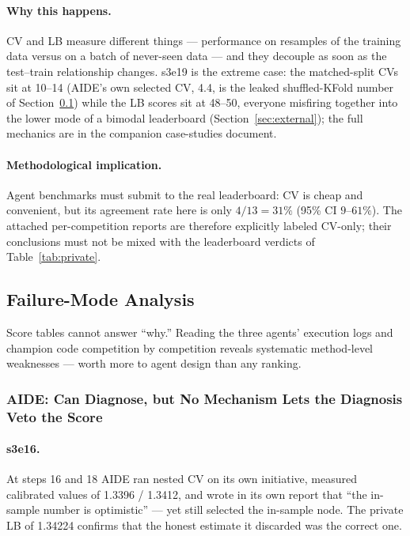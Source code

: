 \documentclass[11pt,a4paper]{article}
\begin{document}
\paragraph{Why this happens.} CV and LB measure different things --- performance on resamples of the training data versus on a batch of never-seen data --- and they decouple as soon as the test--train relationship changes. s3e19 is the extreme case: the matched-split CVs sit at 10--14 (AIDE's own selected CV, 4.4, is the leaked shuffled-KFold number of Section~\ref{sec:exp4}) while the LB scores sit at 48--50, everyone misfiring together into the lower mode of a bimodal leaderboard (Section~\ref{sec:external}); the full mechanics are in the companion case-studies document.

\paragraph{Methodological implication.} Agent benchmarks must submit to the real leaderboard: CV is cheap and convenient, but its agreement rate here is only $4/13 = 31\%$ (95\% CI $9$--$61\%$). The attached per-competition reports are therefore explicitly labeled CV-only; their conclusions must not be mixed with the leaderboard verdicts of Table~\ref{tab:private}.

\subsection{Failure-Mode Analysis}
\label{sec:exp4}

Score tables cannot answer ``why.'' Reading the three agents' execution logs and champion code competition by competition reveals systematic method-level weaknesses --- worth more to agent design than any ranking.

\subsubsection{AIDE: Can Diagnose, but No Mechanism Lets the Diagnosis Veto the Score}

\paragraph{s3e16.} At steps 16 and 18 AIDE ran nested CV on its own initiative, measured calibrated values of 1.3396 / 1.3412, and wrote in its own report that ``the in-sample number is optimistic'' --- yet still selected the in-sample node. The private LB of 1.34224 confirms that the honest estimate it discarded was the correct one.
\end{document}
